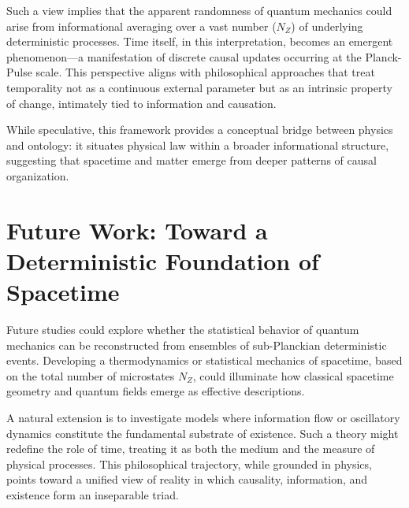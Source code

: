 \documentclass[12pt]{article}
\begin{document}
Such a view implies that the apparent randomness of quantum mechanics could arise from informational averaging over a vast number ($N_Z$) of underlying deterministic processes. Time itself, in this interpretation, becomes an emergent phenomenon---a manifestation of discrete causal updates occurring at the Planck-Pulse scale. This perspective aligns with philosophical approaches that treat temporality not as a continuous external parameter but as an intrinsic property of change, intimately tied to information and causation.

While speculative, this framework provides a conceptual bridge between physics and ontology: it situates physical law within a broader informational structure, suggesting that spacetime and matter emerge from deeper patterns of causal organization.

\section{Future Work: Toward a Deterministic Foundation of Spacetime}
Future studies could explore whether the statistical behavior of quantum mechanics can be reconstructed from ensembles of sub-Planckian deterministic events. Developing a thermodynamics or statistical mechanics of spacetime, based on the total number of microstates $N_Z$, could illuminate how classical spacetime geometry and quantum fields emerge as effective descriptions.

A natural extension is to investigate models where information flow or oscillatory dynamics constitute the fundamental substrate of existence. Such a theory might redefine the role of time, treating it as both the medium and the measure of physical processes. This philosophical trajectory, while grounded in physics, points toward a unified view of reality in which causality, information, and existence form an inseparable triad.
\end{document}
